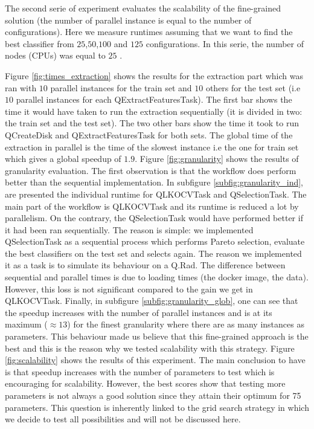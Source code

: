 \documentclass[10pt, conference, compsocconf]{IEEEtran}
\begin{document}
The second serie of experiment evaluates the scalability of the fine-grained solution (the number of parallel instance is equal to the 
number of configurations). Here we measure runtimes assuming that we want to find the best classifier from $25$,$50$,$100$ and $125$ 
configurations. In this serie, the number of nodes (CPUs) was equal to $25$ .  

Figure \ref{fig:times_extraction} shows the results for the extraction part which was ran with $10$ parallel instances for the train set and $10$ others for the test set (i.e $10$ parallel instances for each QExtractFeaturesTask). The first bar shows the time it would have taken to run the extraction sequentially (it is divided in two: the train set and the test set). The two other bars show the time it took to run QCreateDisk and QExtractFeaturesTask for both sets. The global time of the extraction in parallel is the time of the slowest instance i.e the one for train set which gives a global speedup of $1.9$. Figure \ref{fig:granularity} shows the results of granularity evaluation. The first observation is that the workflow does perform better than the sequential implementation. In subfigure \ref{subfig:granularity_ind}, are presented the individual runtime for QLKOCVTask and QSelectionTask. The main part of the workflow is QLKOCVTask and its runtime is reduced a lot by parallelism. On the contrary, the QSelectionTask would have performed better if it had been ran sequentially. The reason is simple: we implemented QSelectionTask as a sequential process which performs Pareto selection, evaluate the best classifiers on the test set and selects again. The reason we implemented it as a task is to simulate its behaviour on a Q.Rad. The difference between sequential and parallel times is due to loading times (the docker image, the data). However, this loss is not significant compared to the gain we get in QLKOCVTask.  Finally, in subfigure \ref{subfig:granularity_glob}, one can see that the speedup increases with the number of parallel instances and is at its maximum ($\approx 13$) for the finest granularity where there are as many instances as parameters. This behaviour made us believe that this fine-grained approach is the best and this is the reason why we tested scalability with this strategy. Figure \ref{fig:scalability} shows the results of this experiment. The main conclusion to have is that speedup increases with the number of parameters to test which is encouraging for scalability. However, the best scores show that testing more parameters is not always a good solution since they attain their optimum for 75 parameters. This question is inherently linked to the grid search strategy in which we decide to test all possibilities and will not be discussed here.
\end{document}
